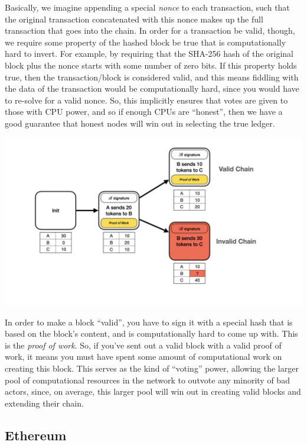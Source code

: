\documentclass[10pt,a4paper]{article}
\begin{document}
Basically, we imagine appending a special \textit{nonce} to each transaction, such that the original transaction concatenated with this nonce makes up the full transaction that goes into the chain. In order for a transaction be valid, though, we require some property of the hashed block be true that is computationally hard to invert. For example, by requiring that the SHA-256 hash of the original block plus the nonce starts with some number of zero bits. If this property holds true, then the transaction/block is considered valid, and this means fiddling with the data of the transaction would be computationally hard, since you would have to re-solve for a valid nonce. So, this implicitly ensures that votes are given to those with CPU power, and so if enough CPUs are ``honest'', then we have a good guarantee that honest nodes will win out in selecting the true ledger. 

\begin{center}
    \includegraphics[scale=0.19]{diagrams/blockchain_diagrams/blockchain_diagrams.001.png}
\end{center}

In order to make a block ``valid'', you have to sign it with a special hash that is based on the block's content, and is computationally hard to come up with. This is the \textit{proof of work}. So, if you've sent out a valid block with a valid proof of work, it means you must have spent some amount of computational work on creating this block. This serves as the kind of ``voting'' power, allowing the larger pool of computational resources in the network to outvote any minority of bad actors, since, on average, this larger pool will win out in creating valid blocks and extending their chain.


\subsection{Ethereum}
\end{document}
